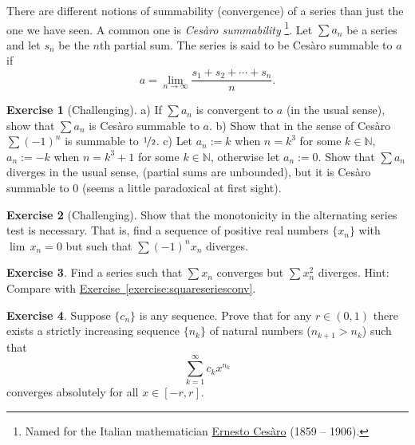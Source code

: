 \documentclass[12pt]{book}
\newcommand{\N}{{\mathbb{N}}}
\newcommand{\myindex}[1]{#1\index{#1}}
\theoremstyle{plain}
\theoremstyle{remark}
\theoremstyle{definition}
\newenvironment{exnote}{\small}{}
\theoremstyle{exercise}
\newtheorem{exercise}{Exercise}[section]
\theoremstyle{example}
\newcommand{\exerciseref}[1]{\hyperref[#1]{Exercise~\ref*{#1}}}
\begin{document}
\begin{exnote}
There are different notions of summability (convergence)
of a series
than just the one we have seen.
A common one is \emph{\myindex{Ces{\`a}ro summability}}%
\footnote{Named for the Italian mathematician
\href{http://en.wikipedia.org/wiki/Ernesto_Ces\%C3\%A0ro}{Ernesto Ces{\`a}ro}
(1859 -- 1906).}.  Let $\sum a_n$ be a series
and let $s_n$ be the $n$th partial sum.  The series is said to
be Ces{\`a}ro summable to $a$ if
\begin{equation*}
a = \lim_{n\to \infty} \frac{s_1 + s_2 + \cdots + s_n}{n} .
\end{equation*}
\end{exnote}

\begin{exercise}[Challenging]
a) If $\sum a_n$ is convergent to $a$ (in the usual sense), show that
$\sum a_n$ is Ces{\`a}ro summable to $a$.
b) Show that in the sense of Ces{\`a}ro $\sum {(-1)}^n$ is summable to
$\nicefrac{1}{2}$.
c) Let $a_n := k$ when $n = k^3$ for some $k \in \N$,
$a_n := -k$ when $n = k^3+1$ for some $k \in \N$,
otherwise
let $a_n := 0$.  Show that $\sum a_n$ diverges in the usual sense,
(partial sums are unbounded), but it is
Ces{\`a}ro summable to 0 (seems a little paradoxical at first sight).
\end{exercise}

\begin{exercise}[Challenging]
Show that the monotonicity in the alternating series test
is necessary.  That is, find a sequence of positive real numbers
$\{ x_n \}$ with $\lim\, x_n = 0$ but such that
$\sum {(-1)}^n x_n$ diverges.
\end{exercise}

\begin{exercise}
Find a series such that $\sum x_n$ converges but $\sum x_n^2$ diverges.
Hint: Compare with \exerciseref{exercise:squareseriesconv}.
\end{exercise}

\begin{exercise}
Suppose $\{ c_n \}$ is any sequence.  Prove that for any $r \in (0,1)$
there exists a strictly increasing sequence $\{ n_k \}$ of natural numbers ($n_{k+1} > n_k$) such that
\begin{equation*}
\sum_{k=1}^\infty c_k x^{n_k}
\end{equation*}
converges absolutely for all $x \in [-r,r]$.
\end{exercise}


\end{document}
